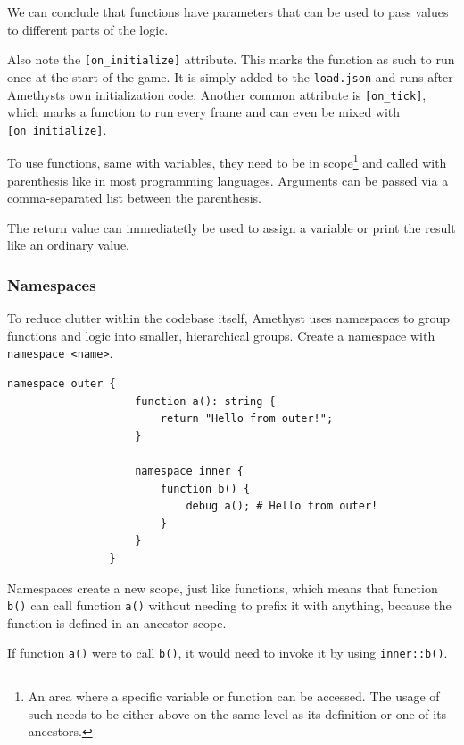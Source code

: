 \documentclass[12pt]{article}
\begin{document}
            We can conclude that functions have parameters that can be used to pass values to different parts of the logic.
            
            Also note the \lstinline{[on_initialize]} attribute. This marks the function as such to run once at the start of the game. It is simply added to the \lstinline{load.json} and runs after Amethysts own initialization code. Another common attribute is \lstinline{[on_tick]}, which marks a function to run every frame and can even be mixed with \lstinline{[on_initialize]}.
            
            To use functions, same with variables, they need to be in scope\footnote{An area where a specific variable or function can be accessed. The usage of such needs to be either above on the same level as its definition or one of its ancestors.} and called with parenthesis like in most programming languages. Arguments can be passed via a comma-separated list between the parenthesis.
            
            The return value can immediatetly be used to assign a variable or print the result like an ordinary value.
            
        \subsubsection{Namespaces}
            To reduce clutter within the codebase itself, Amethyst uses namespaces to group functions and logic into smaller, hierarchical groups. Create a namespace with \lstinline{namespace <name>}.

            \begin{lstlisting}[title=file\_1.amy]
                namespace outer {
                    function a(): string {
                        return "Hello from outer!";
                    }
                    
                    namespace inner {
                        function b() {
                            debug a(); # Hello from outer!
                        }
                    }
                }
            \end{lstlisting}
            
            Namespaces create a new scope, just like functions, which means that function \lstinline{b()} can call function \lstinline{a()} without needing to prefix it with anything, because the function is defined in an ancestor scope.
            
            If function \lstinline{a()} were to call \lstinline{b()}, it would need to invoke it by using \lstinline{inner::b()}.
\end{document}
